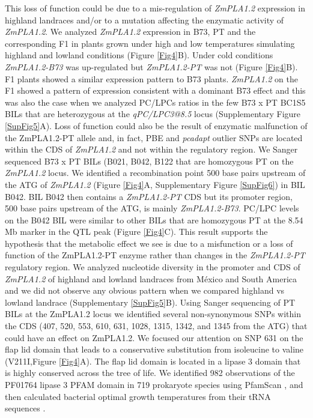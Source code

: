 \documentclass[9pt,twocolumn,twoside,lineno]{BioRxiv}
\begin{document}
This loss of function could be due to a mis-regulation of \textit{ZmPLA1.2} expression in highland landraces and/or to a mutation affecting the enzymatic activity of \textit{ZmPLA1.2}. 
We analyzed \textit{ZmPLA1.2} expression in B73, PT and the corresponding F1 in plants grown under high and low temperatures simulating highland and lowland conditions (Figure \ref{Fig4}B). 
Under cold conditions \textit{ZmPLA1.2-B73} was up-regulated but \textit{ZmPLA1.2-PT} was not (Figure \ref{Fig4}B). 
F1 plants showed a similar expression pattern to B73 plants.
\textit{ZmPLA1.2} on the F1 showed a pattern of expression consistent with a dominant B73 effect and this was also the case when we analyzed PC/LPCs ratios in the few B73 x PT BC1S5 BILs that are heterozygous at the \textit{qPC/LPC3@8.5} locus (Supplementary Figure \ref{SupFig5}A).
Loss of function could also be the result of enzymatic malfunction of the ZmPLA1.2-PT allele and, in fact, PBE and \textit{pcadapt} outlier SNPs are located within the CDS of \textit{ZmPLA1.2} and not within the regulatory region. 
We Sanger sequenced B73 x PT BILs (B021, B042, B122 that are homozygous PT on the \textit{ZmPLA1.2} locus.
We identified a recombination point 500 base pairs upstream of the ATG of \textit{ZmPLA1.2} (Figure \ref{Fig4}A, Supplementary Figure \ref{SupFig6}) in BIL B042.
BIL B042 then contains a \textit{ZmPLA1.2-PT} CDS but its promoter region, 500 base pairs upstream of the ATG, is mainly \textit{ZmPLA1.2-B73}.  
PC/LPC levels on the B042 BIL were similar to other BILs that are homozygous PT at the 8.54 Mb marker in the QTL peak (Figure \ref{Fig4}C). 
This result supports the hypothesis that the metabolic effect we see is due to a misfunction or a loss of function of the ZmPLA1.2-PT enzyme rather than changes in the \textit{ZmPLA1.2-PT} regulatory region. 
We analyzed nucleotide diversity in the promoter and CDS of \textit{ZmPLA1.2} of highland and lowland landraces from México and South America and we did not observe any obvious pattern  when we compared highland vs lowland landrace (Supplementary \ref{SupFig5}B).
Using Sanger sequencing of PT BILs at the ZmPLA1.2 locus we identified several non-synonymous SNPs within the CDS (407, 520, 553, 610, 631, 1028, 1315, 1342, and 1345 from the ATG) that could have an effect on ZmPLA1.2.
We focused our attention on SNP 631 on the flap lid domain that leads to a conservative substitution from isoleucine to valine (V211I,Figure \ref{Fig4}A).  
The flap lid domain is located in a lipase 3 domain that is highly conserved across the tree of life. 
We identified 982 observations of the PF01764 lipase 3 PFAM domain in 719 prokaryote species using PfamScan \cite{Potter2018-tk, El-Gebali2019-pw}, and then calculated bacterial optimal growth temperatures from their tRNA sequences \cite{Cimen2020-dm}.
\end{document}
